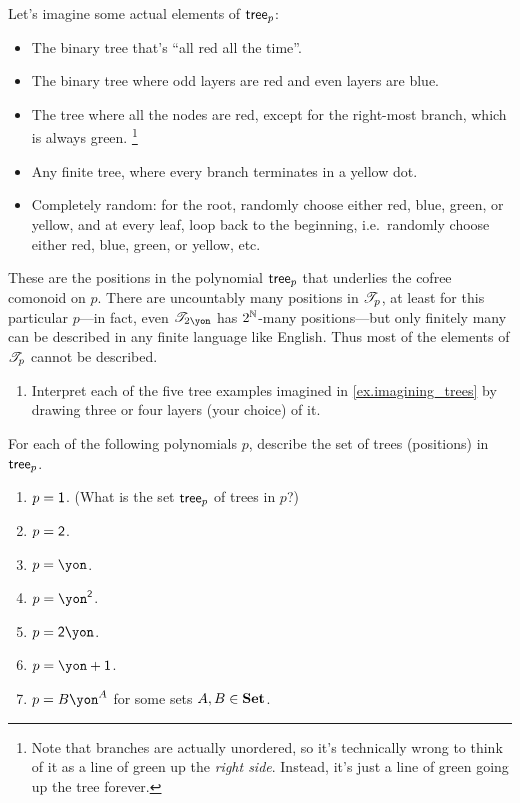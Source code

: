 \documentclass[DynamicalBook]{subfiles}
\begin{document}
\begin{example}
Let's imagine some actual elements of $\mathsf{tree}_p$:
\begin{itemize}
	\item The binary tree that's ``all red all the time''.
	\item The binary tree where odd layers are red and even layers are blue.
	\item The tree where all the nodes are red, except for the right-most branch, which is always green.%
	\footnote{\;Note that branches are actually unordered, so it's technically wrong to think of it as a line of green up the \emph{right side}. Instead, it's just a line of green going up the tree forever.}
	\item Any finite tree, where every branch terminates in a yellow dot.
	\item Completely random: for the root, randomly choose either red, blue, green, or yellow, and at every leaf, loop back to the beginning, i.e.\ randomly choose either red, blue, green, or yellow, etc.
\end{itemize}
These are the positions in the polynomial $\mathsf{tree}_p$ that underlies the cofree comonoid on $p$. There are uncountably many positions in $\mathscr{T}_{p}$, at least for this particular $p$---in fact, even $\cofree{2\yon}$ has $2^{\mathbb{N}}$-many positions---but only finitely many can be described in any finite language like English. Thus most of the elements of $\mathscr{T}_{p}$ cannot be described.
\end{example}

\begin{exercise}\label{exc.trees_1}
\begin{enumerate}
	\item Interpret each of the five tree examples imagined in \cref{ex.imagining_trees} by drawing three or four layers (your choice) of it.
\end{enumerate}
For each of the following polynomials $p$, describe the set of trees (positions) in $\mathsf{tree}_{p}$.
\begin{enumerate}[resume]
	\item $p=\textsf{1}$. (What is the set $\mathsf{tree}_p$ of trees in $p$?)
	\item $p=\textsf{2}$.
	\item $p=\yon$.
	\item $p=\yon^\2$.
	\item $p={\2\yon}$.
	\item $p={\yon+\1}$.
	\item $p={B\yon^A}$ for some sets $A,B\in\textbf{Set}$.
\qedhere
\end{enumerate}
\end{exercise}
\end{document}
